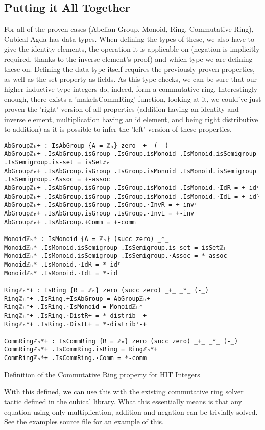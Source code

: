 \begin{listing}[H]
\section{Putting it All Together}
For all of the proven cases (Abelian Group, Monoid, Ring, Commutative Ring), Cubical Agda has data types. When defining the types of these, we also have to give the identity elements, the operation it is applicable on (negation is implicitly required, thanks to the inverse element's proof) and which type we are defining these on. Defining the data type itself requires the previously proven properties, as well as the set property as fields.
As this type checks, we can be sure that our higher inductive type integers do, indeed, form a commutative ring.
Interestingly enough, there exists a 'makeIsCommRing' function, looking at it, we could've just proven the 'right' version of all properties (addition having an identity and inverse element, multiplication having an id element, and being right distributive to addition) as it is possible to infer the 'left' version of these properties.

\begin{verbatim}
AbGroupℤₕ+ : IsAbGroup {A = ℤₕ} zero _+_ (-_)
AbGroupℤₕ+ .IsAbGroup.isGroup .IsGroup.isMonoid .IsMonoid.isSemigroup .IsSemigroup.is-set = isSetℤₕ
AbGroupℤₕ+ .IsAbGroup.isGroup .IsGroup.isMonoid .IsMonoid.isSemigroup .IsSemigroup.·Assoc = +-assoc
AbGroupℤₕ+ .IsAbGroup.isGroup .IsGroup.isMonoid .IsMonoid.·IdR = +-idʳ
AbGroupℤₕ+ .IsAbGroup.isGroup .IsGroup.isMonoid .IsMonoid.·IdL = +-idˡ
AbGroupℤₕ+ .IsAbGroup.isGroup .IsGroup.·InvR = +-invʳ
AbGroupℤₕ+ .IsAbGroup.isGroup .IsGroup.·InvL = +-invˡ
AbGroupℤₕ+ .IsAbGroup.+Comm = +-comm

Monoidℤₕ* : IsMonoid {A = ℤₕ} (succ zero) _*_
Monoidℤₕ* .IsMonoid.isSemigroup .IsSemigroup.is-set = isSetℤₕ
Monoidℤₕ* .IsMonoid.isSemigroup .IsSemigroup.·Assoc = *-assoc
Monoidℤₕ* .IsMonoid.·IdR = *-idʳ
Monoidℤₕ* .IsMonoid.·IdL = *-idˡ

Ringℤₕ*+ : IsRing {R = ℤₕ} zero (succ zero) _+_ _*_ (-_)
Ringℤₕ*+ .IsRing.+IsAbGroup = AbGroupℤₕ+
Ringℤₕ*+ .IsRing.·IsMonoid = Monoidℤₕ*
Ringℤₕ*+ .IsRing.·DistR+ = *-distribʳ-+
Ringℤₕ*+ .IsRing.·DistL+ = *-distribˡ-+

CommRingℤₕ*+ : IsCommRing {R = ℤₕ} zero (succ zero) _+_ _*_ (-_)
CommRingℤₕ*+ .IsCommRing.isRing = Ringℤₕ*+
CommRingℤₕ*+ .IsCommRing.·Comm = *-comm
\end{verbatim}
\caption{Definition of the Commutative Ring property for HIT Integers}
\end{listing}

With this defined, we can use this with the existing commutative ring solver tactic defined in the cubical library. What this essentially means is that any equation using only multiplication, addition and negation can be trivially solved. See the examples source file for an example of this.

